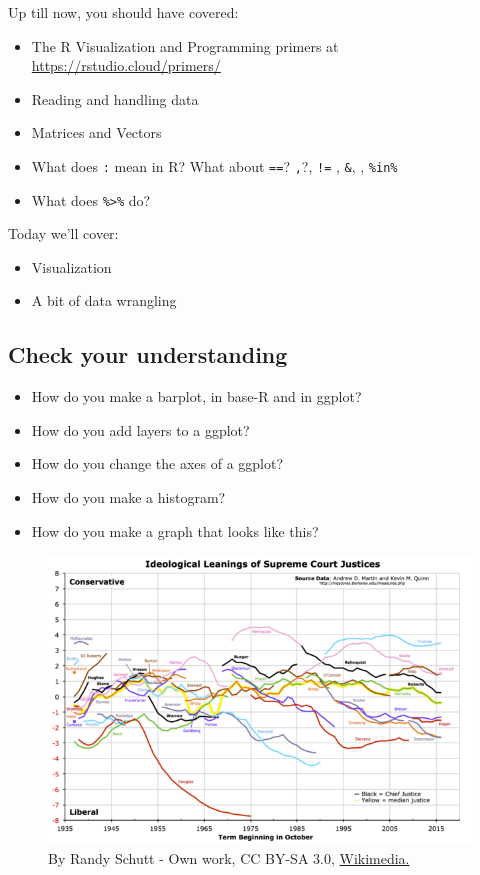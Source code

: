 \documentclass[]{book}
\providecommand{\tightlist}{%
  \setlength{\itemsep}{0pt}\setlength{\parskip}{0pt}}
\theoremstyle{definition}
\theoremstyle{definition}
\theoremstyle{definition}
\theoremstyle{remark}
\begin{document}
Up till now, you should have covered:

\begin{itemize}
\tightlist
\item
  The R Visualization and Programming primers at
  \url{https://rstudio.cloud/primers/}
\item
  Reading and handling data
\item
  Matrices and Vectors
\item
  What does \texttt{:} mean in R? What about \texttt{==}? \texttt{,}?,
  \texttt{!=} , \texttt{\&}, \texttt{\textbar{}}, \texttt{\%in\%}
\item
  What does \texttt{\%\textgreater{}\%} do?
\end{itemize}

Today we'll cover:

\begin{itemize}
\tightlist
\item
  Visualization
\item
  A bit of data wrangling
\end{itemize}

\subsection*{Check your understanding}\label{check-your-understanding-1}

\begin{itemize}
\tightlist
\item
  How do you make a barplot, in base-R and in ggplot?
\item
  How do you add layers to a ggplot?
\item
  How do you change the axes of a ggplot?
\item
  How do you make a histogram?
\item
  How do you make a graph that looks like this?
\end{itemize}

\begin{figure}
\centering
\includegraphics{images/Martin-Quinn_Wikipedia.png}
\caption{By Randy Schutt - Own work, CC BY-SA 3.0,
\href{https://commons.wikimedia.org/w/index.php?curid=29585342}{Wikimedia.}}
\end{figure}
\end{document}
